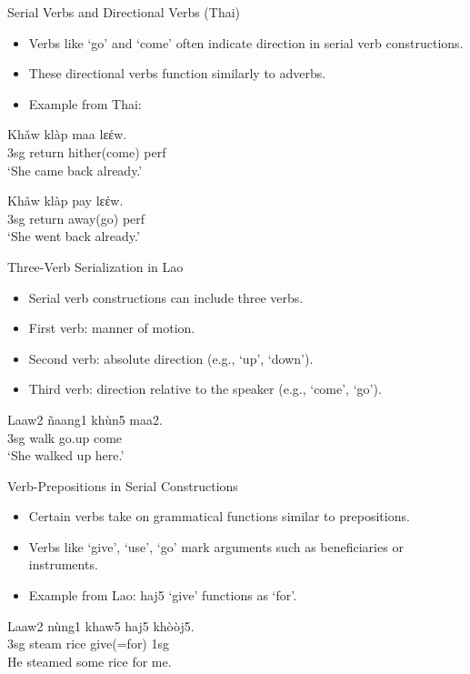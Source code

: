 \documentclass{beamer}
\begin{document}
\begin{frame}{Serial Verbs and Directional Verbs (Thai)}
\begin{itemize}
    \item Verbs like ‘go’ and ‘come’ often indicate direction in serial verb constructions.
    \item These directional verbs function similarly to adverbs.
    \item Example from Thai:
\end{itemize}
\begin{exe}
\ex
\gll Khǎw klàp maa {\silipa lɛέw}. \\
    3sg return hither(come) perf \\
\trans ‘She came back already.’ \\
\end{exe}
\begin{exe}
\ex
\gll Khǎw klàp pay  {\silipa lɛέw}. \\
    3sg return away(go) perf \\
\trans ‘She went back already.’ \\
\end{exe}
\end{frame}

\begin{frame}{Three-Verb Serialization in Lao}
\begin{itemize}
    \item Serial verb constructions can include three verbs.
    \item First verb: manner of motion.
    \item Second verb: absolute direction (e.g., ‘up’, ‘down’).
    \item Third verb: direction relative to the speaker (e.g., ‘come’, ‘go’).
\end{itemize}
\begin{exe}
\ex
\gll Laaw2 ñaang1 khùn5 maa2. \\
    3sg walk go.up come \\
\trans ‘She walked up here.’ \\
\end{exe}
\end{frame}

\begin{frame}{Verb-Prepositions in Serial Constructions}
\begin{itemize}
    \item Certain verbs take on grammatical functions similar to prepositions.
    \item Verbs like ‘give’, ‘use’, ‘go’ mark arguments such as beneficiaries or instruments.
    \item Example from Lao: haj5 ‘give’ functions as ‘for’.
\end{itemize}
\begin{exe}
\ex
\gll Laaw2 nùng1 khaw5 haj5 khòòj5. \\
    3sg steam rice give(=for) 1sg \\
\trans He steamed some rice for me. \\
\end{exe}
\end{frame}
\end{document}
